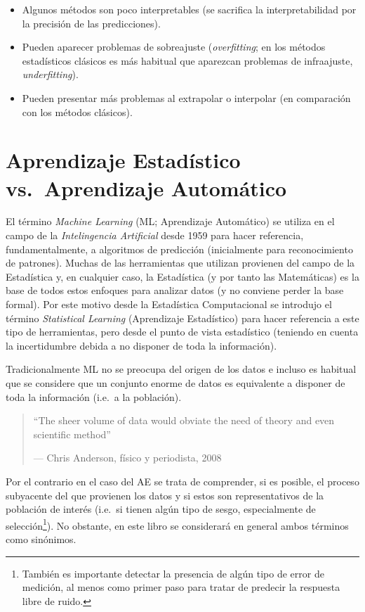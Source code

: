 \documentclass[
  spanish,
]{book}
\theoremstyle{break}
\theoremstyle{definition}
\theoremstyle{definition}
\theoremstyle{definition}
\theoremstyle{definition}
\theoremstyle{remark}
\begin{document}
\begin{itemize}
\item
  Algunos métodos son poco interpretables (se sacrifica la interpretabilidad por la precisión de las predicciones).
\item
  Pueden aparecer problemas de sobreajuste (\emph{overfitting}; en los métodos estadísticos clásicos es más habitual que aparezcan problemas de infraajuste, \emph{underfitting}).
\item
  Pueden presentar más problemas al extrapolar o interpolar (en comparación con los métodos clásicos).
\end{itemize}

\hypertarget{aprendizaje-estaduxedstico-vs.-aprendizaje-automuxe1tico}{%
\section{Aprendizaje Estadístico vs.~Aprendizaje Automático}\label{aprendizaje-estaduxedstico-vs.-aprendizaje-automuxe1tico}}

El término \emph{Machine Learning} (ML; Aprendizaje Automático) se utiliza en el campo de la \emph{Intelingencia Artificial} desde 1959 para hacer referencia, fundamentalmente, a algoritmos de predicción (inicialmente para reconocimiento de patrones).
Muchas de las herramientas que utilizan provienen del campo de la Estadística y, en cualquier caso, la Estadística (y por tanto las Matemáticas) es la base de todos estos enfoques para analizar datos (y no conviene perder la base formal).
Por este motivo desde la Estadística Computacional se introdujo el término \emph{Statistical Learning} (Aprendizaje Estadístico) para hacer referencia a este tipo de herramientas, pero desde el punto de vista estadístico (teniendo en cuenta la incertidumbre debida a no disponer de toda la información).

Tradicionalmente ML no se preocupa del origen de los datos e incluso es habitual que se considere que un conjunto enorme de datos es equivalente a disponer de toda la información (i.e.~a la población).

\begin{quote}
``The sheer volume of data would obviate the need of theory and even
scientific method''

--- Chris Anderson, físico y periodista, 2008
\end{quote}

Por el contrario en el caso del AE se trata de comprender, si es posible, el proceso subyacente del que provienen los datos y si estos son representativos de la población de interés (i.e.~si tienen algún tipo de sesgo, especialmente de selección\footnote{También es importante detectar la presencia de algún tipo de error de medición, al menos como primer paso para tratar de predecir la respuesta libre de ruido.}).
No obstante, en este libro se considerará en general ambos términos como sinónimos.
\end{document}
